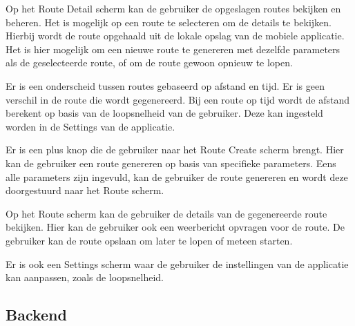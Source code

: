     Op het Route Detail scherm kan de gebruiker de opgeslagen routes bekijken en beheren. Het is mogelijk op een route te selecteren om de details te bekijken. Hierbij wordt de route opgehaald uit de lokale opslag van de mobiele applicatie. Het is hier mogelijk om een nieuwe route te genereren met dezelfde parameters als de geselecteerde route, of om de route gewoon opnieuw te lopen.

    Er is een onderscheid tussen routes gebaseerd op afstand en tijd. Er is geen verschil in de route die wordt gegenereerd. Bij een route op tijd wordt de afstand berekent op basis van de loopsnelheid van de gebruiker. Deze kan ingesteld worden in de Settings van de applicatie.


    Er is een plus knop die de gebruiker naar het Route Create scherm brengt. Hier kan de gebruiker een route genereren op basis van specifieke parameters. Eens alle parameters zijn ingevuld, kan de gebruiker de route genereren en wordt deze doorgestuurd naar het Route scherm.


    Op het Route scherm kan de gebruiker de details van de gegenereerde route bekijken. Hier kan de gebruiker ook een weerbericht opvragen voor de route. De gebruiker kan de route opslaan om later te lopen of meteen starten.


    Er is ook een Settings scherm waar de gebruiker de instellingen van de applicatie kan aanpassen, zoals de loopsnelheid.

    \subsection{Backend}
    
